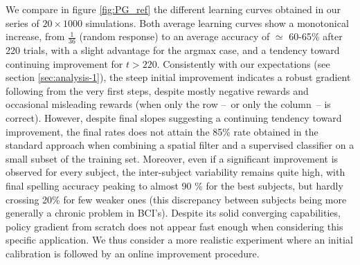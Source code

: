 \documentclass[conference]{IEEEtran}
\begin{document}

We compare in figure \ref{fig:PG_ref} the different learning curves obtained  
in our series of $20 \times 1000$ simulations.
Both average learning curves show a monotonical increase, from $\frac{1}{36}$ (random response)
to an average accuracy of $\simeq$ 60-65\% after 220 trials, with a slight advantage for the argmax case, 
and a tendency toward continuing improvement for $t > 220$.
Consistently with our expectations (see section \ref{sec:analysis-1}), the steep initial improvement indicates a robust 
gradient following from the very first steps, despite mostly negative rewards 
and occasional misleading rewards (when only the row --~or only the column~-- is correct).
However, despite final slopes suggesting a continuing tendency
toward improvement, the final rates does not attain the 85\% rate obtained in the standard approach 
when combining a spatial filter and a
supervised classifier on a small subset of the training set. 
Moreover, even if a significant improvement is observed for every subject, the inter-subject variability remains quite high, 
with final spelling accuracy peaking to almost 90 \% for the best subjects, but hardly crossing 20\%
for few weaker ones (this discrepancy between subjects being more generally a chronic problem in BCI's). 
Despite its solid converging capabilities, policy gradient from scratch does not appear fast enough when considering
this specific application. We thus consider a more realistic experiment where an initial calibration is followed by an
online improvement procedure.

\end{document}
